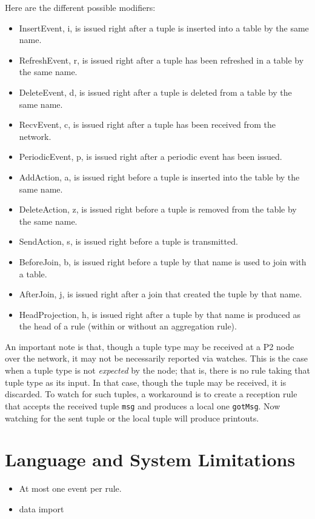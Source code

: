 \documentclass{article}
\begin{document}
Here are the different possible modifiers:
\begin{itemize}
\item InsertEvent, i, is issued right after a tuple is inserted into
  a table by the same name.
\item RefreshEvent, r, is issued right after a tuple has been refreshed
  in a table by the same name.
\item DeleteEvent, d, is issued right after a tuple is deleted from a
  table by the same name.
\item RecvEvent, c, is issued right after a tuple has been received from
  the network.
\item PeriodicEvent, p, is issued right after a periodic event has been issued.
\item AddAction, a, is issued right before a tuple is inserted into the
  table by the same name.
\item DeleteAction, z, is issued right before a tuple is removed from
  the table by the same name.
\item SendAction, s, is issued right before a tuple is transmitted.
\item BeforeJoin, b, is issued right before a tuple by that name is used
  to join with a table.
\item AfterJoin, j, is issued right after a join that created the tuple
  by that name.
\item HeadProjection, h, is issued right after a tuple by that name is
  produced as the head of a rule (within or without an aggregation rule).
\end{itemize}

An important note is that, though a tuple type may be received at a P2
node over the network, it may not be necessarily reported via
watches. This is the case when a tuple type is not \emph{expected} by
the node; that is, there is no rule taking that tuple type as its
input.  In that case, though the tuple may be received, it is
discarded.  To watch for such tuples, a workaround is to create a
reception rule that accepts the received tuple \lstinline$msg$ and produces a local
one \lstinline$gotMsg$.  Now watching for the sent tuple or the local
tuple will produce printouts.


\section{Language and System Limitations}
\begin{itemize}
\item At most one event per rule.
\item data import
\end{itemize}
\end{document}

